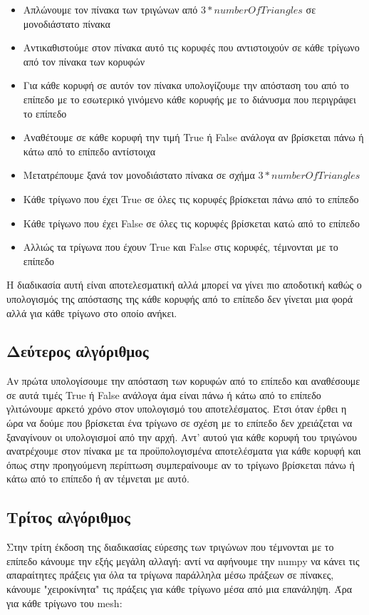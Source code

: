 \documentclass{article}
\begin{document}
\begin{itemize}
	\item Απλώνουμε τον πίνακα των τριγώνων από $3*numberOfTriangles$ σε μονοδιάστατο πίνακα
	\item Αντικαθιστούμε στον πίνακα αυτό τις κορυφές που αντιστοιχούν σε κάθε τρίγωνο
		από τον πίνακα των κορυφών
	\item Για κάθε κορυφή σε αυτόν τον πίνακα υπολογίζουμε την απόσταση του από το επίπεδο με το εσωτερικό γινόμενο κάθε κορυφής με το διάνυσμα που περιγράφει το επίπεδο
	\item Αναθέτουμε σε κάθε κορυφή την τιμή True ή False ανάλογα αν βρίσκεται πάνω ή κάτω από το επίπεδο αντίστοιχα
	\item Μετατρέπουμε ξανά τον μονοδιάστατο πίνακα σε σχήμα $3*numberOfTriangles$
	\item Κάθε τρίγωνο που έχει True σε όλες τις κορυφές βρίσκεται πάνω από το επίπεδο
	\item Κάθε τρίγωνο που έχει False σε όλες τις κορυφές βρίσκεται κατώ από το επίπεδο
	\item Αλλιώς τα τρίγωνα που έχουν True και False στις κορυφές, τέμνονται με το επίπεδο
\end{itemize}

Η διαδικασία αυτή είναι αποτελεσματική αλλά μπορεί να γίνει πιο αποδοτική καθώς ο
υπολογισμός της απόστασης της κάθε κορυφής από το επίπεδο δεν γίνεται μια φορά αλλά για
κάθε τρίγωνο στο οποίο ανήκει.

\subsection{Δεύτερος αλγόριθμος}
Αν πρώτα υπολογίσουμε την απόσταση των κορυφών από το επίπεδο και αναθέσουμε σε αυτά
τιμές True ή False ανάλογα άμα είναι πάνω ή κάτω από το επίπεδο γλιτώνουμε αρκετό χρόνο
στον υπολογισμό του αποτελέσματος. Έτσι όταν έρθει η ώρα να δούμε που βρίσκεται ένα
τρίγωνο σε σχέση με το επίπεδο δεν χρειάζεται να ξαναγίνουν οι υπολογισμοί από την αρχή.
Αντ' αυτού για κάθε κορυφή του τριγώνου ανατρέχουμε στον πίνακα με τα προϋπολογισμένα
αποτελέσματα για κάθε κορυφή και όπως στην προηγούμενη περίπτωση συμπεραίνουμε αν το
τρίγωνο βρίσκεται πάνω ή κάτω από το επίπεδο ή αν τέμνεται με αυτό.

\subsection{Τρίτος αλγόριθμος}
Στην τρίτη έκδοση της διαδικασίας εύρεσης των τριγώνων που τέμνονται με το επίπεδο
κάνουμε την εξής μεγάλη αλλαγή: αντί να αφήνουμε την numpy να κάνει τις απαραίτητες
πράξεις για όλα τα τρίγωνα παράλληλα μέσω πράξεων σε πίνακες, κάνουμε "χειροκίνητα" τις
πράξεις για κάθε τρίγωνο μέσα από μια επανάληψη. Άρα για κάθε τρίγωνο του mesh:
\end{document}
